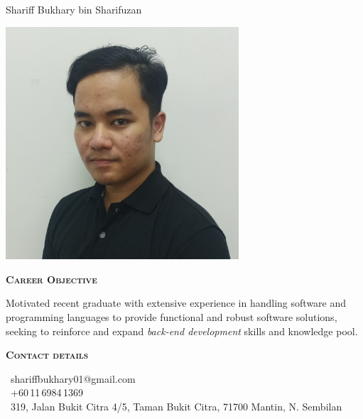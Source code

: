 \documentclass[11pt, a4paper]{article}
\newcommand{\headleft}[1]{\vspace*{3ex}\textsc{\textbf{#1}}\par%
    \vspace*{-1.5ex}\hrulefill\par\vspace*{0.7ex}}
\begin{document}
\setlength{\topskip}{0pt}
\setlength{\parindent}{0pt}
\setlength{\parskip}{0pt}
\setlength{\fboxsep}{0pt}
\pagestyle{empty}
\raggedbottom
\begin{minipage}[t]{0.33\textwidth} %
\colorbox{cvblue}{\begin{minipage}[t][5mm][t]{\textwidth}\null\hfill\null\end{minipage}}

\colorbox{cvblue!90}{\color{white}  %
\textwidth\relax%
\begin{minipage}[t][293mm][t]{0.82\textwidth}
\raggedright
\vspace*{2.5ex}

\Large Shariff Bukhary bin Sharifuzan \normalsize 

\null\hfill\includegraphics[width=0.65\textwidth]{side-pic-square.jpg}\hfill\null

\vspace*{0.5ex} %

\headleft{Career Objective}
Motivated recent graduate with extensive experience in handling software
and programming languages to provide functional and robust software
solutions, seeking to reinforce and expand \textit{back-end development} skills
and knowledge pool.

\headleft{Contact details}
\small %
\MVAt\ {\small shariffbukhary01@gmail.com} \\[0.4ex]
\Mobilefone\ +60\,11\,6984\,1369\\[0.5ex]
\Letter\ 319, Jalan Bukit Citra 4/5,
Taman Bukit Citra,
71700 Mantin, N. Sembilan
\normalsize


\end{minipage}}
\end{minipage}
\end{document}
